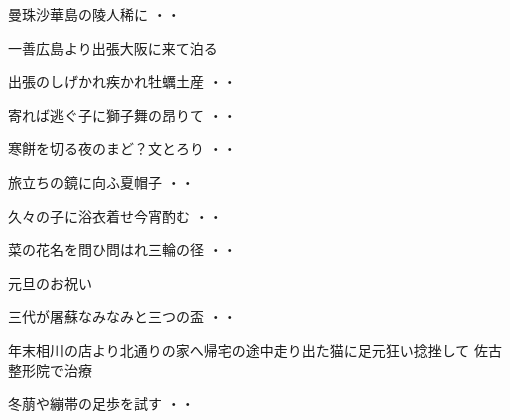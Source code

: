 \begin{shiika}曼珠沙華島の陵人稀に
\hfill{・・}\end{shiika}
\vspace{0.6cm}
一善広島より出張大阪に来て泊る
\begin{shiika}出張のしげかれ疾かれ牡蠣土産
\hfill{・・}\end{shiika}
\begin{shiika}寄れば逃ぐ子に獅子舞の昂りて
\hfill{・・}\end{shiika}
\begin{shiika}寒餅を切る夜のまど？文とろり
\hfill{・・}\end{shiika}
\begin{shiika}旅立ちの鏡に向ふ夏帽子
\hfill{・・}\end{shiika}
\begin{shiika}久々の子に浴衣着せ今宵酌む
\hfill{・・}\end{shiika}
\begin{shiika}菜の花名を問ひ問はれ三輪の径
\hfill{・・}\end{shiika}
\vspace{0.6cm}
元旦のお祝い
\begin{shiika}三代が屠蘇なみなみと三つの盃
\hfill{・・}\end{shiika}
\vspace{0.6cm}
年末相川の店より北通りの家へ帰宅の途中走り出た猫に足元狂い捻挫して
佐古整形院で治療
\begin{shiika}冬萠や繃帯の足歩を試す
\hfill{・・}\end{shiika}
\vspace{0.6cm}

